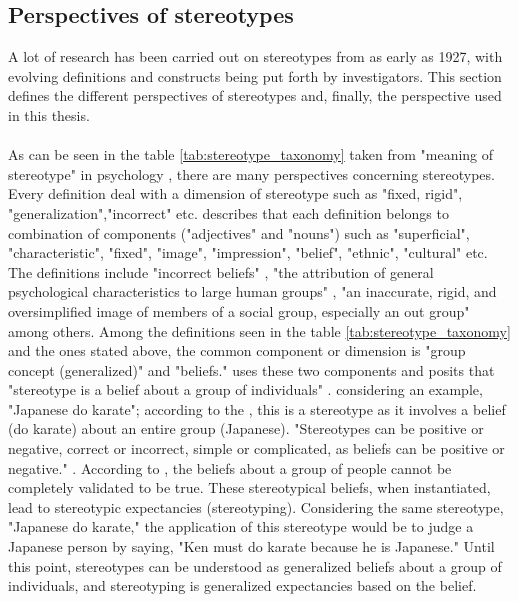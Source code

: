 \subsection{Perspectives of stereotypes}
A lot of research has been carried out on stereotypes from as early as 1927, with evolving definitions and constructs being put forth by investigators. This section defines the different perspectives of stereotypes and, finally, the perspective used in this thesis.
\\
\\
As can be seen in the table \ref{tab:stereotype_taxonomy} taken from "meaning of stereotype" in psychology
\cite{ashmore1981conceptual}, there are many perspectives concerning stereotypes. Every definition deal with a dimension of stereotype  such as "fixed, rigid", "generalization","incorrect" etc. \cite{kanahara2006review} describes that each definition belongs to combination of components ("adjectives" and "nouns") such as "superficial", "characteristic", "fixed", "image", "impression", "belief", "ethnic", "cultural" etc.  The definitions include "incorrect beliefs" \cite{katz1935racial}, "the attribution of general psychological characteristics to large human groups" \cite{watson1974psychology}, "an inaccurate, rigid, and oversimplified image of members of a social
group, especially an out group" \cite{coon1994essentials} among others. 
Among the definitions seen in the table \ref{tab:stereotype_taxonomy} and the ones stated above, the common component or dimension is "group concept (generalized)" and "beliefs."  \cite{kanahara2006review} uses these two components and posits that "stereotype is a belief about a group of individuals"  \cite{kanahara2006review}.
considering an example, "Japanese do karate"; according to the \cite{kanahara2006review}, this is a stereotype as it involves a belief (do karate) about an entire group (Japanese). "Stereotypes can be positive or negative, correct or incorrect, simple or complicated, as beliefs can be positive or negative." \cite{kanahara2006review}. According to \cite{kanahara2006review}, the beliefs about a group of people cannot be completely validated to be true.
These stereotypical beliefs, when instantiated, lead to stereotypic expectancies (stereotyping). Considering the same stereotype, "Japanese do karate," the application of this stereotype would be to judge a Japanese person by saying, "Ken must do karate because he is Japanese."
Until this point, stereotypes can be understood as generalized beliefs about a group of individuals, and stereotyping is generalized expectancies based on the belief. 

